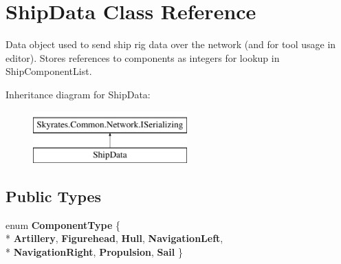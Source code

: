 \hypertarget{class_ship_data}{\section{Ship\-Data Class Reference}
\label{class_ship_data}
}


Data object used to send ship rig data over the network (and for tool usage in editor). Stores references to components as integers for lookup in Ship\-Component\-List.  


Inheritance diagram for Ship\-Data\-:\begin{figure}[H]
\begin{center}
\leavevmode
\includegraphics[height=2.000000cm]{class_ship_data}
\end{center}
\end{figure}
\subsection*{Public Types}
\begin{DoxyCompactItemize}
\item 
enum {\bfseries Component\-Type} \{ \\*
{\bfseries Artillery}, 
{\bfseries Figurehead}, 
{\bfseries Hull}, 
{\bfseries Navigation\-Left}, 
\\*
{\bfseries Navigation\-Right}, 
{\bfseries Propulsion}, 
{\bfseries Sail}
 \}
\end{DoxyCompactItemize}
